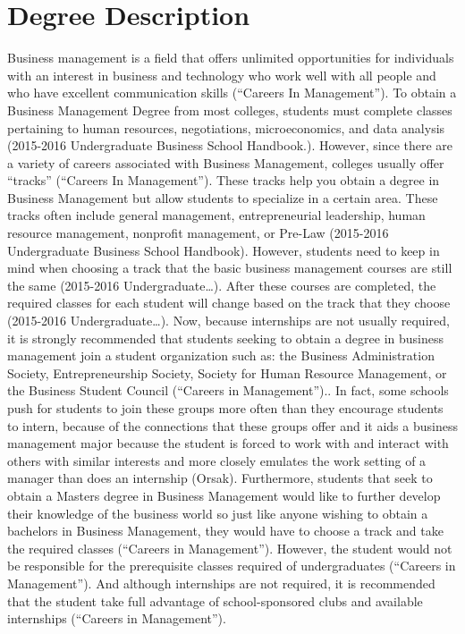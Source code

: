 \section{Degree Description}
    Business management is a field that offers unlimited opportunities for individuals with an interest in business and technology who work well with all people and who have excellent communication skills (“Careers In Management”). To obtain a Business Management Degree from most colleges, students must complete classes pertaining to human resources, negotiations, microeconomics, and data analysis (2015-2016 Undergraduate Business School Handbook.). However, since there are a variety of careers associated with Business Management, colleges usually offer “tracks” (“Careers In Management”). These tracks help you obtain a degree in Business Management but allow students to specialize in a certain area. These tracks often include general management, entrepreneurial leadership, human resource management, nonprofit management, or Pre-Law (2015-2016 Undergraduate Business School Handbook). However, students need to keep in mind when choosing a track that the basic business management courses are still the same (2015-2016 Undergraduate…). After these courses are completed, the required classes for each student will change based on the track that they choose (2015-2016 Undergraduate…). Now, because internships are not usually required, it is strongly recommended that students seeking to obtain a degree in business management join a student organization such as: the Business Administration Society, Entrepreneurship Society, Society for Human Resource Management, or the Business Student Council (“Careers in Management”).. In fact, some schools push for students to join these groups more often than they encourage students to intern, because of the connections that these groups offer and it aids a business management major because the student is forced to work with and interact with others with similar interests and more closely emulates the work setting of a manager than does an internship (Orsak). Furthermore, students that seek to obtain a Masters degree in Business Management would like to further develop their knowledge of the business world so just like anyone wishing to obtain a bachelors in Business Management, they would have to choose a track and take the required classes (“Careers in Management”). However, the student would not be responsible for the prerequisite classes required of undergraduates (“Careers in Management”). And although internships are not required, it is recommended that the student take full advantage of school-sponsored clubs and available internships (“Careers in Management”).
